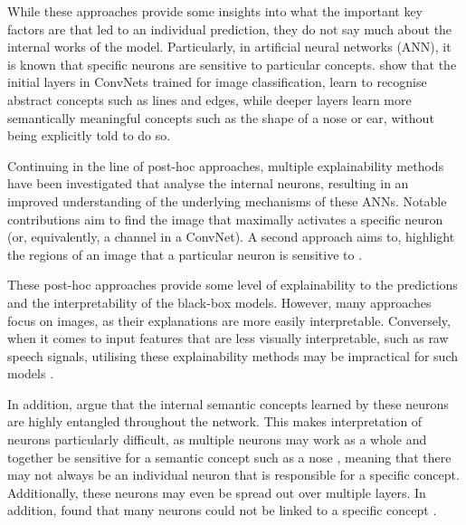 While these approaches provide some insights into what the important key factors are that led to an individual prediction, they do not say much about the internal works of the model. Particularly, in artificial neural networks (ANN), it is known that specific neurons are sensitive to particular concepts. \cite{zeilerVisualizingUnderstandingConvolutional2013} show that the initial layers in ConvNets trained for image classification, learn to recognise abstract concepts such as lines and edges, while deeper layers learn more semantically meaningful concepts such as the shape of a nose or ear, without being explicitly told to do so.


Continuing in the line of post-hoc approaches, multiple explainability methods have been investigated that analyse the internal neurons, resulting in an improved understanding of the underlying mechanisms of these ANNs. Notable contributions aim to find the image that maximally activates a specific neuron \citep{simonyanDeepConvolutionalNetworks2014} (or, equivalently, a channel in a ConvNet). A second approach aims to, highlight the regions of an image that a particular neuron is sensitive to \citep{zeilerVisualizingUnderstandingConvolutional2013}.

These post-hoc approaches provide some level of explainability to the predictions and the interpretability of the black-box models. However, many approaches focus on images, as their explanations are more easily interpretable. Conversely, when it comes to input features that are less visually interpretable, such as raw speech signals, utilising these explainability methods may be impractical for such models \citep{krugAnalyzingVisualizingDeep2021}.

In addition, \cite{bauNetworkDissectionQuantifying2017} argue that the internal semantic concepts learned by these neurons are highly entangled throughout the network. This makes interpretation of neurons particularly difficult, as multiple neurons may work as a whole and together be sensitive for a semantic concept such as a nose \citep{molnarInterpretableMachineLearning2022}, meaning that there may not always be an individual neuron that is responsible for a specific concept. Additionally, these neurons may even be spread out over multiple layers.  %
In addition, \citeauthor{bauNetworkDissectionQuantifying2017} found that many neurons could not be linked to a specific concept \citep{molnarInterpretableMachineLearning2022}.

